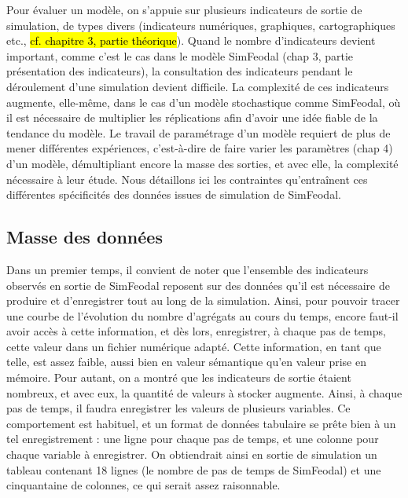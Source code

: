 Pour évaluer un modèle, on s'appuie sur plusieurs indicateurs de sortie de simulation, de types divers (indicateurs numériques, graphiques, cartographiques etc., \hl{cf. chapitre 3, partie théorique}).
Quand le nombre d'indicateurs devient important, comme c'est le cas dans le modèle SimFeodal (chap 3, partie présentation des indicateurs), la consultation des indicateurs pendant le déroulement d'une simulation devient difficile.
La complexité de ces indicateurs augmente, elle-même, dans le cas d'un modèle stochastique comme SimFeodal, où il est nécessaire de multiplier les réplications afin d'avoir une idée fiable de la tendance du modèle.
Le travail de paramétrage d'un modèle requiert de plus de mener différentes expériences, c'est-à-dire de faire varier les paramètres (chap 4) d'un modèle, démultipliant encore la masse des sorties, et avec elle, la complexité nécessaire à leur étude.
Nous détaillons ici les contraintes qu'entraînent ces différentes spécificités des données issues de simulation de SimFeodal.

	\subsection{Masse des données}
	Dans un premier temps, il convient de noter que l'ensemble des indicateurs observés en sortie de SimFeodal reposent sur des données qu'il est nécessaire de produire et d'enregistrer tout au long de la simulation.
	Ainsi, pour pouvoir tracer une courbe de l'évolution du nombre d'agrégats au cours du temps, encore faut-il avoir accès à cette information, et dès lors, enregistrer, à chaque pas de temps, cette valeur dans un fichier numérique adapté.
	Cette information, en tant que telle, est assez faible, aussi bien en valeur sémantique qu'en valeur prise en mémoire.
	Pour autant, on a montré que les indicateurs de sortie étaient nombreux, et avec eux, la quantité de valeurs à stocker augmente.
	Ainsi, à chaque pas de temps, il faudra enregistrer les valeurs de plusieurs variables.
	Ce comportement est habituel, et un format de données tabulaire se prête bien à un tel enregistrement : une ligne pour chaque pas de temps, et une colonne pour chaque variable à enregistrer.
	On obtiendrait ainsi en sortie de simulation un tableau contenant 18 lignes (le nombre de pas de temps de SimFeodal) et une cinquantaine de colonnes, ce qui serait assez raisonnable.

